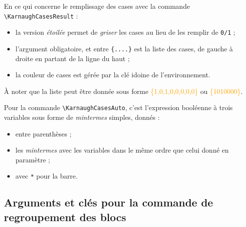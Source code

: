 \documentclass[french,a4paper,11pt]{article}
\newcommand\Cle[1]{{\small\sffamily\textlangle \textcolor{orange}{#1}\textrangle}}
\begin{document}
{{\begin{tipblock}
En ce qui concerne le remplissage des cases avec la commande \texttt{\textbackslash KarnaughCasesResult} :

\begin{itemize}
	\item la version \textit{étoilée} permet de \textit{griser} les cases au lieu de les remplir de \texttt{0/1} ;
	\item l'argument obligatoire, et entre \texttt{\{....\}} est la liste des cases, de gauche à droite en partant de la ligne du haut ;
	\item la couleur de cases est gérée par la clé idoine de l'environnement.
\end{itemize}

À noter que la liste peut être donnée sous forme \Cle{\{1,0,1,0,0,0,0,0\}} ou \Cle{\{1010000\}}.
\end{tipblock}

\begin{tipblock}
Pour la commande \texttt{\textbackslash KarnaughCasesAuto}, c'est l'expression booléenne à trois variables sous forme de \textit{mintermes} simples, donnés :
%
\begin{itemize}
	\item entre parenthèses ;
	\item les \textit{mintermes} avec les variables dans le même ordre que celui donné en paramètre ;
	\item avec \texttt{*} pour la barre.
\end{itemize}
\vspace*{-\baselineskip}\leavevmode
\end{tipblock}

\begin{DemoCode}[]
\begin{TableKarnaugh}
\end{TableKarnaugh}
\begin{TableKarnaugh}[Swap]
\end{TableKarnaugh}

\begin{TableKarnaugh}[Variables=k/l/m,StyleAlternatif]
\end{TableKarnaugh}
\end{DemoCode}

\pagebreak

\subsection{Arguments et clés pour la commande de regroupement des blocs}

}}
\end{document}
